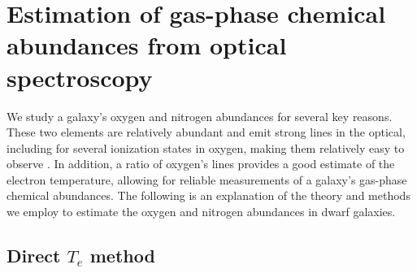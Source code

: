 

%
%
\section[Abundance calculations]{Estimation of gas-phase chemical abundances from optical spectroscopy}

We study a galaxy's oxygen and nitrogen abundances for several key reasons.  
These two elements are relatively abundant and emit strong lines in the optical, 
including for several ionization states in oxygen, making them relatively easy 
to observe \citep{Kewley02}.  In addition, a ratio of oxygen's lines provides a 
good estimate of the electron temperature, allowing for reliable measurements of 
a galaxy's gas-phase chemical abundances.  The following is an explanation of 
the theory and methods we employ to estimate the oxygen and nitrogen abundances 
in dwarf galaxies.


\subsection{Direct $T_e$ method}\label{sec:DirectTe}

